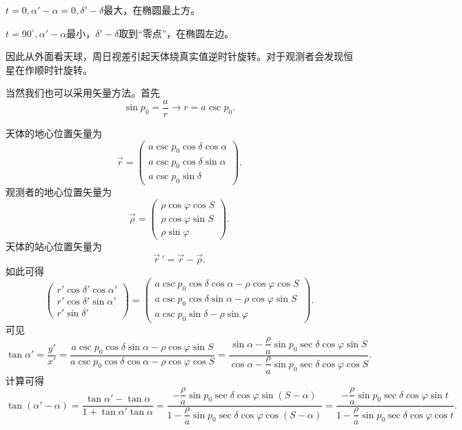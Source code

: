 \documentclass[11pt, a4paper, oneside]{ctexart}
\numberwithin{equation}{subsection}
\begin{document}
$t=0,\alpha'-\alpha=0,\delta'-\delta$最大，在椭圆最上方。

$t=90^\circ,\alpha'-\alpha$最小，$\delta'-\delta$取到“零点”，在椭圆左边。

因此从外面看天球，周日视差引起天体绕真实值逆时针旋转。对于观测者会发现恒星在作顺时针旋转。

当然我们也可以采用矢量方法。首先
\begin{equation}
\sin p_0=\frac{a}{r}\to r=a\csc p_0.
\end{equation}

天体的地心位置矢量为
\begin{equation}
\vec r=\begin{pmatrix}
a\csc p_0\cos\delta\cos\alpha\\
a\csc p_0\cos\delta\sin\alpha\\
a\csc p_0\sin\delta
\end{pmatrix}.
\end{equation}
观测者的地心位置矢量为
\begin{equation}
\vec\rho=\begin{pmatrix}
\rho\cos\varphi\cos S\\
\rho\cos\varphi\sin S\\
\rho\sin\varphi
\end{pmatrix}.
\end{equation}
天体的站心位置矢量为
\begin{equation}
\vec{r}\,'=\vec r-\vec\rho.
\end{equation}
如此可得
\begin{equation}
\begin{pmatrix}
r'\cos\delta'\cos\alpha'\\
r'\cos\delta'\sin\alpha'\\
r'\sin\delta'
\end{pmatrix}=
\begin{pmatrix}
a\csc p_0\cos\delta\cos\alpha-\rho\cos\varphi\cos S\\
a\csc p_0\cos\delta\sin\alpha-\rho\cos\varphi\sin S\\
a\csc p_0\sin\delta-\rho\sin\varphi
\end{pmatrix}.
\end{equation}
可见
\begin{equation}
\tan\alpha'=\frac{y'}{x'}=\frac{a\csc p_0\cos\delta\sin\alpha-\rho\cos\varphi\sin S}{a\csc p_0\cos\delta\cos\alpha-\rho\cos\varphi\cos S}=\frac{\sin\alpha-\dfrac{\rho}{a}\sin p_0\sec\delta\cos\varphi\sin S}{\cos\alpha-\dfrac{\rho}{a}\sin p_0\sec\delta\cos\varphi\cos S}.
\end{equation}
计算可得
\begin{equation}
\tan{\left(\alpha'-\alpha\right)}=\frac{\tan\alpha'-\tan\alpha}{1+\tan\alpha'\tan\alpha}=\frac{-\dfrac{\rho}{a}\sin p_0\sec\delta\cos\varphi\sin\left(S-\alpha\right)}{1-\dfrac{\rho}{a}\sin p_0\sec\delta\cos\varphi\cos\left(S-\alpha\right)}=\frac{-\dfrac{\rho}{a}\sin p_0\sec\delta\cos\varphi\sin t}{1-\dfrac{\rho}{a}\sin p_0\sec\delta\cos\varphi\cos t}.
\end{equation}
\end{document}
